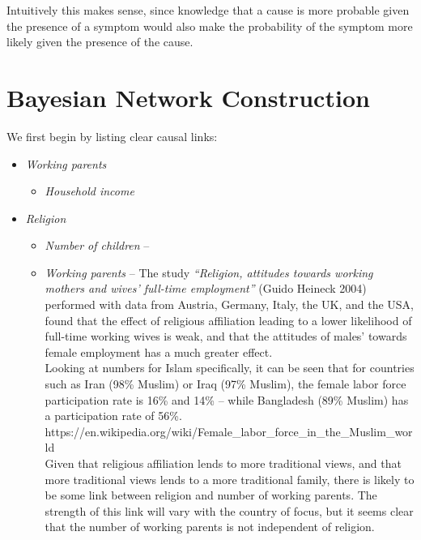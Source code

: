 Intuitively this makes sense, since knowledge that a cause is more probable given the presence of a symptom would also make the probability of the symptom more likely given the presence of the cause.

\section{Bayesian Network Construction}

We first begin by listing clear causal links:

\begin{itemize}
\item \textit{Working parents}
\begin{itemize}
\item \textit{Household income}
\end{itemize}
\item \textit{Religion}
\begin{itemize}
\item \textit{Number of children} -- 
\item \textit{Working parents} -- The study \textit{``Religion, attitudes towards working mothers and wives' full-time employment''} (Guido Heineck 2004) performed with data from Austria, Germany, Italy, the UK, and the USA, found that the effect of religious affiliation leading to a lower likelihood of full-time working wives is weak, and that the attitudes of males' towards female employment has a much greater effect.\\Looking at numbers for Islam specifically, it can be seen that for countries such as Iran (98\% Muslim) or Iraq (97\% Muslim), the female labor force participation rate is 16\% and 14\% -- while Bangladesh (89\% Muslim) has a participation rate of 56\%.\\https://en.wikipedia.org/wiki/Female\_labor\_force\_in\_the\_Muslim\_world\\Given that religious affiliation lends to more traditional views, and that more traditional views lends to a more traditional family, there is likely to be some link between religion and number of working parents. The strength of this link will vary with the country of focus, but it seems clear that the number of working parents is not independent of religion.

\end{itemize}
\end{itemize}
